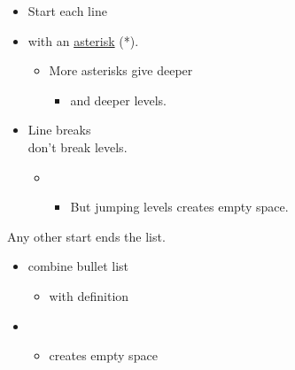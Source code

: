 \documentclass[]{article}
\date{}
\providecommand{\tightlist}{%
  \setlength{\itemsep}{0pt}\setlength{\parskip}{0pt}}
\begin{document}
\begin{itemize}
\tightlist
\item
  Start each line
\item
  with an \href{Wikipedia:asterisk}{asterisk} (*).

  \begin{itemize}
  \tightlist
  \item
    More asterisks give deeper

    \begin{itemize}
    \tightlist
    \item
      and deeper levels.
    \end{itemize}
  \end{itemize}
\item
  Line breaks\\
  don't break levels.

  \begin{itemize}
  \item
    \begin{itemize}
    \tightlist
    \item
      But jumping levels creates empty space.
    \end{itemize}
  \end{itemize}
\end{itemize}

Any other start ends the list.

\begin{itemize}
\tightlist
\item
  combine bullet list

  \begin{itemize}
  \tightlist
  \item
    with definition
  \end{itemize}
\end{itemize}

\begin{description}
\item[]
\end{description}

\begin{itemize}
\item
  \begin{itemize}
  \tightlist
  \item
    creates empty space
  \end{itemize}
\end{itemize}
\end{document}
